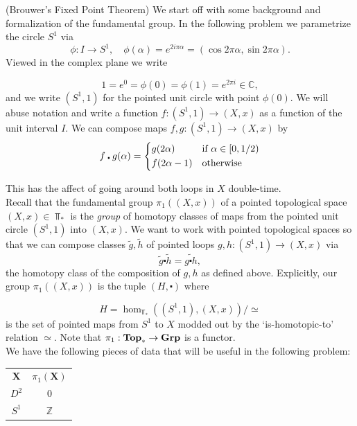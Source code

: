 \begin{problem}(Brouwer's Fixed Point Theorem)
  We start off with some background and formalization of the fundamental group.
  In the following problem we parametrize the circle \(S^1\) via 
  \begin{equation}
    \phi : I \to S^1,\quad \phi(\alpha) = e^{2i\pi \alpha} = (\cos{2\pi \alpha}, \sin 2\pi\alpha).
  \end{equation}
  Viewed in the complex plane we write

  \[1 = e^0 = \phi(0) = \phi(1) = e^{2\pi i} \in \mathbb{C},\]
  and we write \((S^1, 1)\) for the pointed unit circle with point
  \(\phi(0)\). We will abuse notation and write a function \(f : (S^1, 1) \to
  (X,x)\) as a function of the unit interval \(I\).  We can compose maps \(f, g:
  (S^1, 1) \to (X,x)\) by
  \[f \centerdot g(\alpha) = \begin{dcases*}
    g(2\alpha) & if \(\alpha \in [0, 1/2)\)\\
    f(2\alpha - 1) & otherwise
  \end{dcases*}\]

  This has the affect of going around both loops in \(X\) double-time.\\


  Recall that the fundamental group \(\pi_1((X,x))\) of a pointed topological
  space \((X,x) \in \Top_\ast\) is the \textit{group} of homotopy classes of
  maps from the pointed unit circle \((S^1, 1)\) into \((X,x)\). We want to work
  with pointed topological spaces so that we can compose classes \(\widetilde{g},
  \widetilde{h}\) of pointed loops \(g,h : (S^1, 1) \to (X,x)\) via
  \[\widetilde{g} \centerdot \widetilde{h} = \widetilde{g \centerdot h},\] 
  the homotopy class of the composition of \(g, h\) as defined above.
  Explicitly, our group \(\pi_1((X,x))\) is the tuple \((H, \centerdot)\) where
  
  \begin{equation}
    H = \hom_{\Top_*}( (S^1, 1), (X,x)) / \simeq
  \end{equation}
  is the set of pointed maps from \(S^1\) to \(X\) modded out by the `is-homotopic-to'
  relation \(\simeq\).  Note that \(\pi_1 : \mathbf{{Top}}_\ast \to \mathbf{{Grp}}\) is a functor.\\

  We have the following pieces of data that will be useful in the following
  problem:

  \vspace{0.5cm}
  \begin{tabular}{|cc|}\hline
    \(\mathbf{X}\) & \(\pi_1\mathbf{(X)}\)\\
    \(D^2\) & \(0\)\\
    \(S^1\) & \(\mathbb{Z}\)\\\hline
  \end{tabular}
  \vspace{0.5cm}
  


\end{problem}
